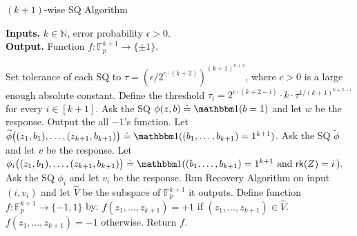 \begin{algorithm}[H]
\caption{$(k+1)$-wise SQ Algorithm}
\label{alg:k_wise_SQ}
{\bf Inputs.} $k \in \mathbb{N}$, error probability $\epsilon > 0$.\\
{\bf Output.} Function $f:\mathbb{F}_p^{k+1} \to \{\pm 1 \}$.
\begin{algorithmic}[1]
\State Set tolerance of each SQ to $\tau = (\epsilon/2^{c\cdot(k+2)})^{(k+1)^{k+3}}$, where $c>0$ is a large enough absolute constant.
\State Define the threshold $\tau_i = 2^{c \cdot (k+2-i)} \cdot k \cdot \tau^{1/(k+1)^{k+2-i}}$ for every $i \in [k+1]$.
\State Ask the SQ $\phi(z,b) \doteq \ind(b=1)$ and let $w$ be the response.
    \State\label{st:early_term} Output the all $-1$'s function.
  \EndIf
\State Let $\widetilde{\phi}\big((z_1,b_1),\ldots,(z_{k+1},b_{k+1}) \big) \doteq \ind((b_1,\dots,b_{k+1}) = 1^{k+1})$.
\State\label{st:v_resp} Ask the SQ $\widetilde{\phi}$ and let $v$ be the response.
\State Let $\phi_i\big((z_1,b_1),\ldots,(z_{k+1},b_{k+1})  \big) \doteq \ind((b_1,\dots,b_{k+1}) = 1^{k+1}\mbox{ and }\rk(Z) = i$).
	\State Ask the SQ $\phi_i$ and let $v_i$ be the response.
	\State Run Recovery Algorithm on input $(i,v_i)$ and let $\widehat{V}$ be the subspace of $\mathbb{F}_p^{k+1}$ it outputs.
	      		\State Define function $f:\mathbb{F}_p^{k+1} \to \{-1,1\}$ by:
	\State $f(z_1,\dots,z_{k+1}) = +1$ if $(z_1,\dots,z_{k+1}) \in \widehat{V}$.
	\State $f(z_1,\dots,z_{k+1}) = -1$ otherwise.
	\State Return $f$.
  \EndIf
      \EndFor

\end{algorithmic}
\end{algorithm}
